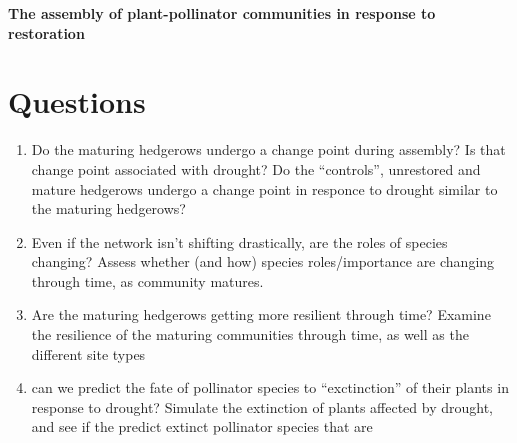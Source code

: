 \documentclass[12pt]{article}
\begin{document}
\begin{centering}
  \large {\bf The assembly of plant-pollinator communities in response
    to restoration} \\
\end{centering}
\vspace{0.15in}

\section{Questions}
\begin{enumerate}
\item Do the maturing hedgerows undergo a change point during
  assembly? Is that change point associated with drought? Do the
  ``controls'', unrestored and mature hedgerows undergo a change point
  in responce to drought similar to the maturing hedgerows?
\item Even if the network isn't shifting drastically, are the roles of
  species changing? Assess whether (and how) species roles/importance
  are changing through time, as community matures.
\item Are the maturing hedgerows getting more resilient through
  time? Examine the resilience of the maturing communities through time,
  as well as the different site types
\item can we predict the fate of pollinator species to ``exctinction''
  of their plants in response to drought? Simulate the extinction of
  plants affected by drought, and see if the predict extinct
  pollinator species that are
\end{enumerate}
\end{document}

